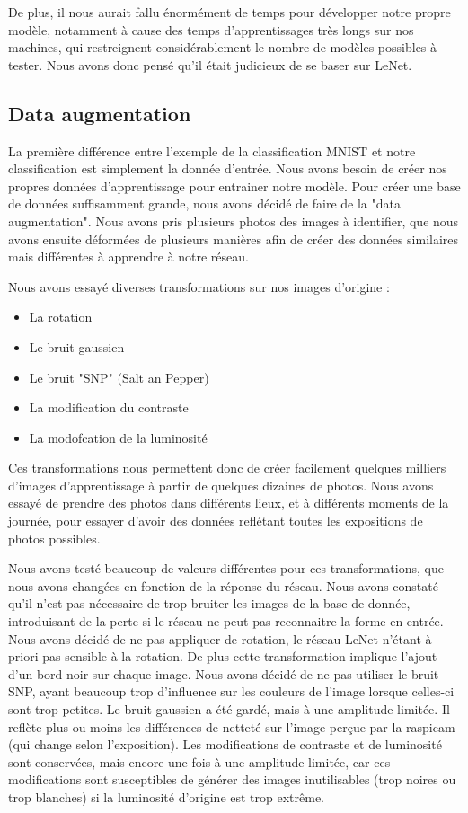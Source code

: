 \documentclass[a4paper,12pt]{article}
\begin{document}
  De plus, il nous aurait fallu énormément de temps pour développer notre propre modèle, notamment à cause des temps d'apprentissages très longs sur nos machines, qui restreignent considérablement le nombre de modèles possibles à tester. Nous avons donc pensé qu'il était judicieux de se baser sur LeNet.
  
  \subsection{Data augmentation}
    La première différence entre l'exemple de la classification MNIST et notre classification est simplement la donnée d'entrée. Nous avons besoin de créer nos propres données d'apprentissage pour entrainer notre modèle. Pour créer une base de données suffisamment grande, nous avons décidé de faire de la "data augmentation". Nous avons pris plusieurs photos des images à identifier, que nous avons ensuite déformées de plusieurs manières afin de créer des données similaires mais différentes à apprendre à notre réseau.

    Nous avons essayé diverses transformations sur nos images d'origine :
    \begin{itemize}
      \item La rotation
      \item Le bruit gaussien
      \item Le bruit "SNP" (Salt an Pepper)
      \item La modification du contraste
      \item La modofcation de la luminosité
    \end{itemize}

    Ces transformations nous permettent donc de créer facilement quelques milliers d'images d'apprentissage à partir de quelques dizaines de photos. Nous avons essayé de prendre des photos dans différents lieux, et à différents moments de la journée, pour essayer d'avoir des données reflétant toutes les expositions de photos possibles.

    Nous avons testé beaucoup de valeurs différentes pour ces transformations, que nous avons changées en fonction de la réponse du réseau. Nous avons constaté qu'il n'est pas nécessaire de trop bruiter les images de la base de donnée, introduisant de la perte si le réseau ne peut pas reconnaitre la forme en entrée. Nous avons décidé de ne pas appliquer de rotation, le réseau LeNet n'étant à priori pas sensible à la rotation. De plus cette transformation implique l'ajout d'un bord noir sur chaque image.
    Nous avons décidé de ne pas utiliser le bruit SNP, ayant beaucoup trop d'influence sur les couleurs de l'image lorsque celles-ci sont trop petites. Le bruit gaussien a été gardé, mais à une amplitude limitée. Il reflète plus ou moins les différences de netteté sur l'image perçue par la raspicam (qui change selon l'exposition).
    Les modifications de contraste et de luminosité sont conservées, mais encore une fois à une amplitude limitée, car ces modifications sont susceptibles de générer des images inutilisables (trop noires ou trop blanches) si la luminosité d'origine est trop extrême. 
\end{document}
